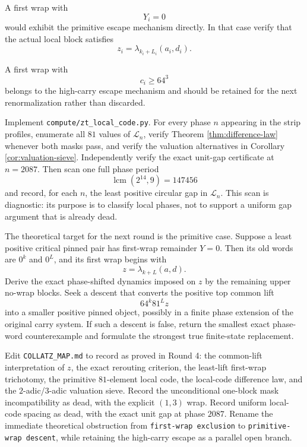 \documentclass[11pt]{article}
\theoremstyle{remark}
\newcommand{\Lset}{\mathcal{L}}
\begin{document}
A first wrap with
\[
Y_i=0
\]
would exhibit the primitive escape mechanism directly.  In that case verify that the actual local block satisfies
\[
z_i=\lambda_{k_i+L_i}(a_i,d_i).
\]

A first wrap with
\[
c_i\ge64^3
\]
belongs to the high-carry escape mechanism and should be retained for the next renormalization rather than discarded.

Implement \texttt{compute/zt\_local\_code.py}.  For every phase \(n\) appearing in the strip profiles, enumerate all \(81\) values of \(\Lset_n\), verify Theorem \ref{thm:difference-law} whenever both masks pass, and verify the valuation alternatives in Corollary \ref{cor:valuation-sieve}.  Independently verify the exact unit-gap certificate at \(n=2087\).  Then scan one full phase period
\[
\operatorname{lcm}(2^{14},9)=147456
\]
and record, for each \(n\), the least positive circular gap in \(\Lset_n\).  This scan is diagnostic: its purpose is to classify local phases, not to support a uniform gap argument that is already dead.

The theoretical target for the next round is the primitive case.  Suppose a least positive critical pinned pair has first-wrap remainder \(Y=0\).  Then its old words are \(0^k\) and \(0^L\), and its first wrap begins with
\[
z=\lambda_{k+L}(a,d).
\]
Derive the exact phase-shifted dynamics imposed on \(z\) by the remaining upper no-wrap blocks.  Seek a descent that converts the positive top common lift
\[
64^k81^Lz
\]
into a smaller positive pinned object, possibly in a finite phase extension of the original carry system.  If such a descent is false, return the smallest exact phase-word counterexample and formulate the strongest true finite-state replacement.

Edit \texttt{COLLATZ\_MAP.md} to record as proved in Round 4: the common-lift interpretation of \(z\), the exact rerouting criterion, the least-lift first-wrap trichotomy, the primitive \(81\)-element local code, the local-code difference law, and the \(2\)-adic/\(3\)-adic valuation sieve.  Record the unconditional one-block mask incompatibility as dead, with the explicit \((1,3)\) wrap.  Record uniform local-code spacing as dead, with the exact unit gap at phase \(2087\).  Rename the immediate theoretical obstruction from \texttt{first-wrap exclusion} to \texttt{primitive-wrap descent}, while retaining the high-carry escape as a parallel open branch.
\end{document}
